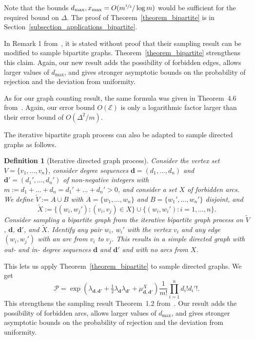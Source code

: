 \documentclass{article}
\theoremstyle{plain}
\theoremstyle{remark}
\theoremstyle{plain}
\newtheorem{definition}[theorem]{Definition}
\numberwithin{equation}{section}
\renewcommand{\d}{{\boldsymbol{d}}}
\begin{document}
	Note that the bounds $d_{\max},x_{\max}=O(m^{\sfrac14}/\log m)$ would be sufficient for the required bound on $\Delta$. The proof of Theorem~\ref{theorem_bipartite} is in Section~\ref{subsection_applications_bipartite}.
	
	In Remark 1 from~\cite{Bayati}, it is stated without proof that their sampling result can be modified to sample bipartite graphs. Theorem~\ref{theorem_bipartite} strengthens this claim. Again, our new result adds the possibility of forbidden edges, allows larger values of $d_{\max}$, and gives stronger asymptotic bounds on the probability of rejection and the deviation from uniformity.
	
	As for our graph counting result, the same formula was given in Theorem~4.6 from~\cite{mckay1984asymptotics}. Again, our error bound $O(\mathscr{E})$ is only a logarithmic factor larger than their error bound of $O(\Delta^2/m)$.
	
	The iterative bipartite graph process can also be adapted to sample directed graphs as follows.
	
	\begin{definition}[Iterative directed graph process]
		Consider the vertex set $V=\{v_1,\ldots,v_n\}$, consider degree sequences $\d=(d_1,\ldots,d_n)$ and $\d'=(d_1',\ldots,d_{n}')$ of non-negative integers with $m:=d_1+\ldots+d_n=d_1'+\ldots+d_{n}'>0$, and consider a set $X$ of forbidden arcs. We define $\widetilde{V}:=A \cup B$ with $A=\{w_1,\ldots,w_n\}$ and $B=\{w_1',\ldots,w_n'\}$ disjoint, and $$\widetilde{X}:=\{(w_i,w_j'):(v_i,v_j)\in X\}\cup\{(w_i,w_i'):i=1,\ldots,n\}.$$ Consider sampling a bipartite graph from the iterative bipartite graph process on $\widetilde{V}$, $\d$, $\d'$, and $\widetilde{X}$. Identify any pair $w_i$, $w_i'$ with the vertex $v_i$ and any edge $(w_i,w_j')$ with an arc from $v_i$ to $v_j$. This results in a simple directed graph with out- and in- degree sequences $\d$ and $\d'$ and with no arcs from $X$.
	\end{definition}
	
	This lets us apply Theorem~\ref{theorem_bipartite} to sample directed graphs. We get $$\mathscr{P}=\exp(\lambda_{\d,\d'}+\tfrac12\lambda_{\d}\lambda_{\d'}+\mu_{\d,\d'}^{X})\frac1{m!}\prod_{i=1}^{n}d_i!d_i'!.$$ This strengthens the sampling result Theorem~1.2 from~\cite{Ieperen2024}. Our result adds the possibility of forbidden arcs, allows larger values of $d_{\max}$, and gives stronger asymptotic bounds on the probability of rejection and the deviation from uniformity.
	
\end{document}
